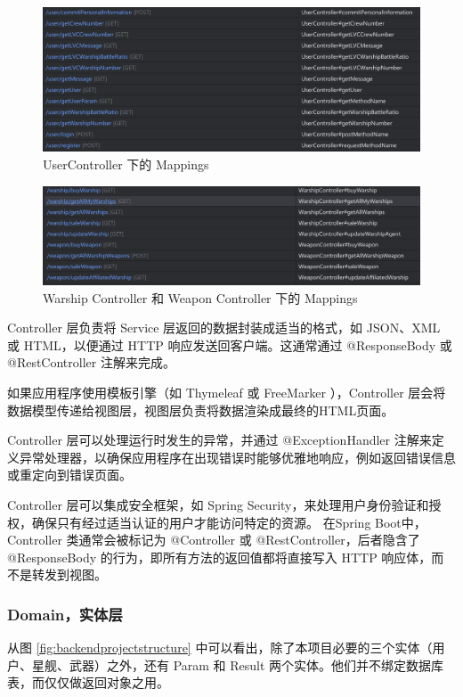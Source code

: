 \documentclass{base}
\begin{document}
\begin{figure}[H]
	\centering
	\includegraphics[width=\linewidth]{images/UserController}
	\caption{UserController 下的 Mappings}
	\label{fig:usercontroller}
\end{figure}

\begin{figure}[H]
	\centering
	\includegraphics[width=\linewidth]{"images/WarshipController & Weapon Controller"}
	\caption{Warship Controller 和 Weapon Controller 下的 Mappings}
	\label{fig:warshipcontroller--weapon-controller}
\end{figure}

Controller 层负责将 Service 层返回的数据封装成适当的格式，如 JSON、XML 或 HTML，以便通过 HTTP 响应发送回客户端。这通常通过 @ResponseBody 或 @RestController 注解来完成。

如果应用程序使用模板引擎（如 Thymeleaf 或 FreeMarker ），Controller 层会将数据模型传递给视图层，视图层负责将数据渲染成最终的HTML页面。

Controller 层可以处理运行时发生的异常，并通过 @ExceptionHandler 注解来定义异常处理器，以确保应用程序在出现错误时能够优雅地响应，例如返回错误信息或重定向到错误页面。

Controller 层可以集成安全框架，如 Spring Security，来处理用户身份验证和授权，确保只有经过适当认证的用户才能访问特定的资源。
在Spring Boot中，Controller 类通常会被标记为 @Controller 或 @RestController，后者隐含了 @ResponseBody 的行为，即所有方法的返回值都将直接写入 HTTP 响应体，而不是转发到视图。

\subsubsection{Domain，实体层}
从图 \ref{fig:backendprojectstructure} 中可以看出，除了本项目必要的三个实体（用户、星舰、武器）之外，还有 Param 和 Result 两个实体。他们并不绑定数据库表，而仅仅做返回对象之用。
\end{document}
